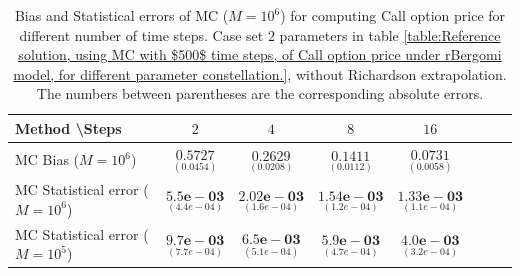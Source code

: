 \documentclass[11pt]{article}
\begin{document}
\begin{table}[h!]
	\centering
	\begin{tabular}{l*{6}{c}r}
		Method \textbackslash  Steps            & $2$ & $4$ & $8$ & $16$  \\
		\hline
		MC Bias ($M=10^6$)   & $\underset{( 0.0454)}{\mathbf{0.5727}}$  & $\underset{ (  0.0208)}{\mathbf{0.2629}}$  & $\underset{(   0.0112)}{\mathbf{0.1411}}$ & $\underset{( 0.0058)}{\mathbf{0.0731}}$  \\	
		
			MC Statistical error ($M=10^6$)  & $\underset{( 4.4e-04)}{\mathbf{5.5e-03}}$  & $\underset{(  1.6e-04)}{\mathbf{2.02e-03}}$  & $\underset{(  1.2e-04)}{\mathbf{1.54e-03}}$ & $\underset{(  1.1e-04)}{\mathbf{1.33e-03}}$ \\	
				
					MC Statistical error ($M=10^5$)  & $\underset{( 7.7e-04)}{\mathbf{9.7e-03}}$  & $\underset{(  5.1e-04)}{\mathbf{6.5e-03}}$  & $\underset{(  4.7e-04)}{\mathbf{5.9e-03}}$ & $\underset{(  3.2e-04)}{\mathbf{4.0e-03}}$ \\
		\hline
	\end{tabular}
	\caption{Bias and Statistical errors of MC ($M=10^6$)  for computing Call option price  for different number of time steps. Case set $2$ parameters in table \ref{table:Reference solution, using MC with $500$ time steps, of Call option price under rBergomi model, for different parameter constellation.}, without Richardson extrapolation. The numbers between parentheses are the corresponding absolute errors.}
	\label{Bias and Statistical errors of MC ($M=10^6$)  for computing Call option price  for different number of time steps. Case set $2$ parameters, without Richardson extrapolation. The numbers between parentheses are the corresponding absolute errors.}
\end{table}
\end{document}
